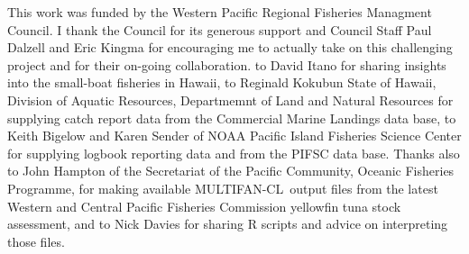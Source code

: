 \documentclass[12pt,letterpaper]{article}
\newcommand\singlespacing{\baselineskip=1.0\normalbaselineskip}
\newcommand\MFCL{MULTIFAN-CL}
\begin{document}

\clearpage
\singlespacing
{}
This work was funded by the Western Pacific Regional Fisheries
Managment Council. I thank the Council for its generous support and
Council Staff Paul Dalzell and Eric Kingma for encouraging me to
actually take on this challenging project and for their on-going
collaboration.
to David Itano for sharing insights into the small-boat
fisheries in Hawaii,
to Reginald Kokubun State of Hawaii, Division of Aquatic Resources,
Departmemnt of Land and Natural Resources for supplying catch report
data from the Commercial Marine Landings data base,
to Keith Bigelow and Karen Sender of NOAA Pacific
Island Fisheries Science Center for supplying logbook reporting data and
from the PIFSC data base.
Thanks also to John Hampton of the Secretariat of the Pacific
Community, Oceanic Fisheries Programme, for making available \MFCL\
output files from the latest Western and Central Pacific
Fisheries Commission yellowfin tuna stock assessment, and to Nick
Davies for sharing R scripts and advice on interpreting those files.
\end{document}
